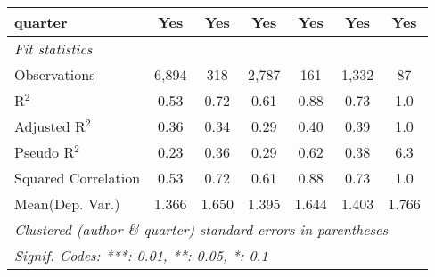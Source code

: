 \begin{tabular}{lcccccc}
   quarter                                                    & Yes          & Yes          & Yes            & Yes           & Yes           & Yes\\  
   \midrule
   \emph{Fit statistics}\\
   Observations                                               & 6,894        & 318          & 2,787          & 161           & 1,332         & 87\\  
   R$^2$                                                      & 0.53         & 0.72         & 0.61           & 0.88          & 0.73          & 1.0\\  
   Adjusted R$^2$                                             & 0.36         & 0.34         & 0.29           & 0.40          & 0.39          & 1.0\\  
   Pseudo R$^2$                                               & 0.23         & 0.36         & 0.29           & 0.62          & 0.38          & 6.3\\  
   Squared Correlation                                        & 0.53         & 0.72         & 0.61           & 0.88          & 0.73          & 1.0\\  
Mean(Dep. Var.) & 1.366 & 1.650 & 1.395 & 1.644 & 1.403 & 1.766 \\
   \midrule \midrule
   \multicolumn{7}{l}{\emph{Clustered (author \& quarter) standard-errors in parentheses}}\\
   \multicolumn{7}{l}{\emph{Signif. Codes: ***: 0.01, **: 0.05, *: 0.1}}\\
\end{tabular}
\par\endgroup
